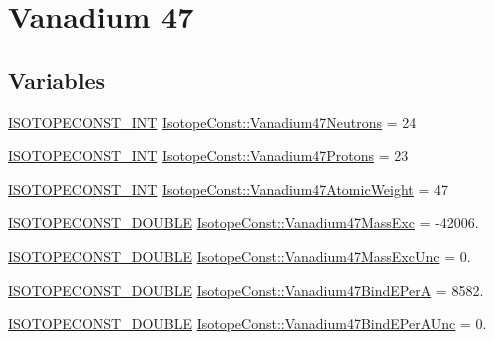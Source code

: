 \hypertarget{group___isotope_const-_vanadium-_v47}{}\section{Vanadium 47}
\label{group___isotope_const-_vanadium-_v47}
\subsection*{Variables}
\begin{DoxyCompactItemize}
\item 
\mbox{\hyperlink{group___isotope_const-_macros_ga5f18360b3e99483a35c32d789e62621c}{I\+S\+O\+T\+O\+P\+E\+C\+O\+N\+S\+T\+\_\+\+I\+NT}} \mbox{\hyperlink{group___isotope_const-_vanadium-_v47_gafc169dbab3fc61406fef180a5b519a9a}{Isotope\+Const\+::\+Vanadium47\+Neutrons}} = 24
\item 
\mbox{\hyperlink{group___isotope_const-_macros_ga5f18360b3e99483a35c32d789e62621c}{I\+S\+O\+T\+O\+P\+E\+C\+O\+N\+S\+T\+\_\+\+I\+NT}} \mbox{\hyperlink{group___isotope_const-_vanadium-_v47_gaa086a6a273e88aa04c59a4c5eb66c753}{Isotope\+Const\+::\+Vanadium47\+Protons}} = 23
\item 
\mbox{\hyperlink{group___isotope_const-_macros_ga5f18360b3e99483a35c32d789e62621c}{I\+S\+O\+T\+O\+P\+E\+C\+O\+N\+S\+T\+\_\+\+I\+NT}} \mbox{\hyperlink{group___isotope_const-_vanadium-_v47_ga2101a4926e64ec7a32cbdcb673410305}{Isotope\+Const\+::\+Vanadium47\+Atomic\+Weight}} = 47
\item 
\mbox{\hyperlink{group___isotope_const-_macros_ga8f45a7272ce02c0b4c65c44636ed719a}{I\+S\+O\+T\+O\+P\+E\+C\+O\+N\+S\+T\+\_\+\+D\+O\+U\+B\+LE}} \mbox{\hyperlink{group___isotope_const-_vanadium-_v47_gab83a3d9c4c0ebb4582991d0c20b6471b}{Isotope\+Const\+::\+Vanadium47\+Mass\+Exc}} = -\/42006.
\item 
\mbox{\hyperlink{group___isotope_const-_macros_ga8f45a7272ce02c0b4c65c44636ed719a}{I\+S\+O\+T\+O\+P\+E\+C\+O\+N\+S\+T\+\_\+\+D\+O\+U\+B\+LE}} \mbox{\hyperlink{group___isotope_const-_vanadium-_v47_ga0b57f4c542f49b06d88b2388fcfd32cd}{Isotope\+Const\+::\+Vanadium47\+Mass\+Exc\+Unc}} = 0.
\item 
\mbox{\hyperlink{group___isotope_const-_macros_ga8f45a7272ce02c0b4c65c44636ed719a}{I\+S\+O\+T\+O\+P\+E\+C\+O\+N\+S\+T\+\_\+\+D\+O\+U\+B\+LE}} \mbox{\hyperlink{group___isotope_const-_vanadium-_v47_gae33fc9a78e8029dad0306a8ad6c36ce4}{Isotope\+Const\+::\+Vanadium47\+Bind\+E\+PerA}} = 8582.
\item 
\mbox{\hyperlink{group___isotope_const-_macros_ga8f45a7272ce02c0b4c65c44636ed719a}{I\+S\+O\+T\+O\+P\+E\+C\+O\+N\+S\+T\+\_\+\+D\+O\+U\+B\+LE}} \mbox{\hyperlink{group___isotope_const-_vanadium-_v47_ga8e23965be19adab51ab621bf7b777979}{Isotope\+Const\+::\+Vanadium47\+Bind\+E\+Per\+A\+Unc}} = 0.

\end{DoxyCompactItemize}
